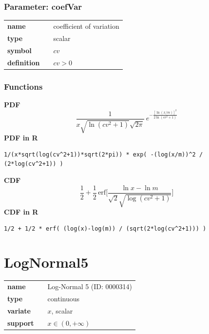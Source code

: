 \documentclass{article}
\begin{document}
\subsubsection*{Parameter: coefVar}

\noindent\begin{tabular}{p{2cm}cl}
\textbf{name} & & coefficient of variation \\
\textbf{type} & & scalar \\
\textbf{symbol} & & $cv$  \\
\textbf{definition} & & $cv>0$
\end{tabular}
\subsubsection*{Functions}

\smallskip \noindent \hspace{.2cm} \textbf{PDF} 
\begin{equation*}\frac{1}{x\sqrt{\ln(cv^2+1)}\sqrt{2\pi}}\ e^{-\frac{\left[\ln (x/m)\right]^2}{2\ln(cv^2+1)}}\end{equation*}
\smallskip \noindent \hspace{.2cm} \textbf{PDF in R}  
\begin{verbatim}1/(x*sqrt(log(cv^2+1))*sqrt(2*pi)) * exp( -(log(x/m))^2 / (2*log(cv^2+1)) )\end{verbatim}
\smallskip \noindent \hspace{.2cm} \textbf{CDF} 
\begin{equation*}\frac12 + \frac12\,\text{erf}\Big[\frac{\ln x-\ln m}{\sqrt{2}\sqrt{\log(cv^2+1)}}\Big]\end{equation*}
\smallskip \noindent \hspace{.2cm} \textbf{CDF in R} 
\begin{verbatim}1/2 + 1/2 * erf( (log(x)-log(m)) / (sqrt(2*log(cv^2+1))) )\end{verbatim}
\smallskip\section*{LogNormal5} 

  \bigskip 

\begin{tabular}{p{2cm}cl}
\textbf{name} & & Log-Normal 5 (ID: 0000314)\\ 
 
\textbf{type} & & continuous \\ 

\textbf{variate} & & $x$, scalar \\ 

\textbf{support} & & $x \in (0,+\infty)$
\end{tabular}
\end{document}

